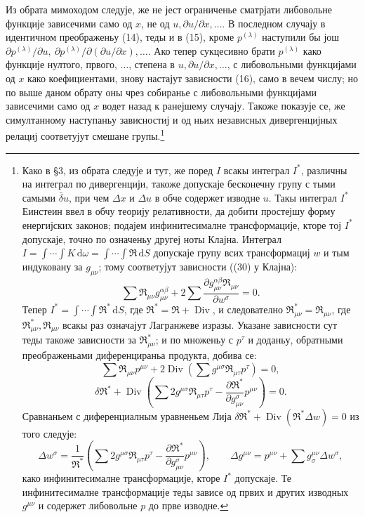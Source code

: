 ﻿\documentclass[11pt]{article}
\providecommand{\D}{\Delta}
\providecommand{\p}{\partial}
\providecommand{\dd}{\mathrm d}
\DeclareMathOperator{\Div}{Div}
\providecommand{\bd}{\bar{\delta}}
\begin{document}
Из обрата мимоходом следује, же не јест ограниченье сматрјати либовольне функције зависечими само од \(x\), не од \(u,\p u/\p x,\ldots\). В последном случају в идентичном преображеньу (14), теды и в (15), кроме \(p^{(\lambda)}\) наступили бы још \(\p p^{(\lambda)}/\p u,\ \p p^{(\lambda)}/\p(\p u/\p x),\ldots\). Ако тепер сукцесивно брати \(p^{(\lambda)}\) како функције нултого, првого, \(\ldots\), степена в \(u,\p u/\p x,\ldots\), с либовольными функцијами од \(x\) како коефициентами, знову настајут зависности (16), само в вечем числу; но по выше даном обрату оны чрез собиранье с либовольными функцијами зависечими само од \(x\) водет назад к ранејшему случају. Такоже показује се, же симултанному наступаньу зависностиј и од ньих независных дивергенцијных релациј соответујут смешане групы.\footnote{Како в \S{}3, из обрата следује и тут, же поред \(I\) всакы интеграл \(I^*\), различны на интеграл по дивергенцији, такоже допускаје бесконечну групу с тыми самыми \(\bd u\), при чем \(\D x\) и \(\D u\) в обче содержет изводне \(u\). Такы интеграл \(I^*\) Еинстеин ввел в обчу теорију релативности, да добити простејшу форму енергијских законов; подајем инфинитесималне трансформације, кторе тој \(I^*\) допускаје, точно по означеньу другеј ноты Клајна. Интеграл \(I=\int\!\cdots\!\int K\,\dd\omega=\int\!\cdots\!\int \mathfrak{R}\,\dd S\) допускаје групу всих трансформациј \(w\) и тым индуковану за \(g_{\mu\nu}\); тому соответујут зависности ((30) у Клајна):
\[
\sum \mathfrak{R}_{\mu\nu}g_{\mu\nu}^{\alpha\beta}
+2\sum\frac{\p g_{\mu\nu}^{\alpha\beta}\mathfrak{R}_{\mu\nu}}{\p w^\sigma}=0.
\]
Тепер \(I^*=\int\!\cdots\!\int \mathfrak{R}^*\,\dd S\), где \(\mathfrak{R}^*=\mathfrak{R}+\Div\), и следователно \(\mathfrak{R}_{\mu\nu}^*=\mathfrak{R}_{\mu\nu}\), где \(\mathfrak{R}_{\mu\nu}^*,\mathfrak{R}_{\mu\nu}\) всакы раз означајут Лагранжеве изразы. Указане зависности сут теды такоже зависности за \(\mathfrak{R}_{\mu\nu}^*\); и по множеньу с \(p^\tau\) и доданьу, обратными преображеньами диференцираньа продукта, добива се:
\[
\sum \mathfrak{R}_{\mu\nu}p^{\mu\nu}
+2\Div\!\left(\sum g^{\mu\sigma}\mathfrak{R}_{\mu\tau}p^\tau\right)=0,
\]
\[
\delta\mathfrak{R}^*+\Div\!\left(\sum 2g^{\mu\sigma}\mathfrak{R}_{\mu\tau}p^\tau
-\frac{\p\mathfrak{R}^*}{\p g_{\mu\nu}^{\sigma}}p^{\mu\nu}\right)=0.
\]
Сравнаньем с диференциалным уравненьем Лија \(\delta\mathfrak{R}^*+\Div(\mathfrak{R}^*\D w)=0\) из того следује:
\[
\D w^\sigma=\frac1{\mathfrak{R}^*}\left(\sum 2g^{\mu\sigma}\mathfrak{R}_{\mu\tau}p^\tau
-\frac{\p\mathfrak{R}^*}{\p g_{\mu\nu}^{\sigma}}p^{\mu\nu}\right),
\qquad
\D g^{\mu\nu}=p^{\mu\nu}+\sum g^{\mu\nu}_{\sigma}\D w^\sigma,
\]
како инфинитесималне трансформације, кторе \(I^*\) допускаје. Те инфинитесималне трансформације теды зависе од првих и других изводных \(g^{\mu\nu}\) и содержет либовольне \(p\) до прве изводне.}
\end{document}
